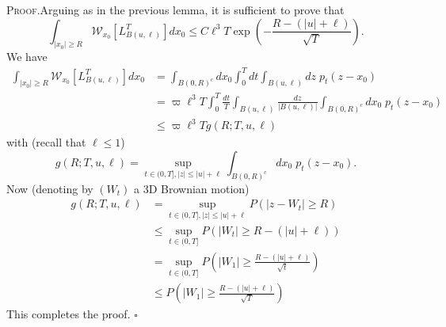 \documentclass[a4paper,12pt]{article}
\begin{document}
\textsc{Proof.}\hspace{0.3cm}Arguing as in the previous lemma, it is
sufficient to prove that
\[
\int_{\left|  x_{0}\right|  \geq R}\mathcal{W}_{x_{0}}[L_{B(u,\ell)}%
^{T}]dx_{0}\leq C\ell^{3}T\exp\left(  -\frac{R-\left(  \left|  u\right|
+\ell\right)  }{\sqrt{T}}\right)  .
\]
We have
\begin{align*}
\int_{\left|  x_{0}\right|  \geq R}\mathcal{W}_{x_{0}}[L_{B(u,\ell)}%
^{T}]dx_{0}  &  =\int_{B(0,R)^{c}}dx_{0}\int_{0}^{T}dt\int_{B(u,\ell
)}dz\;p_{t}\left(  z-x_{0}\right) \\
&  =\varpi\ell^{3}T\int_{0}^{T}\frac{dt}{T}\int_{B(u,\ell)}\frac{dz}%
{|B(u,\ell)|}\int_{B(0,R)^{c}}dx_{0}\;p_{t}\left(  z-x_{0}\right) \\
&  \leq\varpi\ell^{3}Tg\left(  R;T,u,\ell\right)
\end{align*}
with (recall that $\ell\leq1$)
\[
g\left(  R;T,u,\ell\right)  =\sup_{t\in(0,T],\left|  z\right|  \leq\left|
u\right|  +\ell}\int_{B(0,R)^{c}}dx_{0}\;p_{t}\left(  z-x_{0}\right)  .
\]
Now (denoting by $\left(  W_{t}\right)  $ a 3D Brownian motion)
\begin{align*}
g\left(  R;T,u,\ell\right)   &  =\sup_{t\in(0,T],\left|  z\right|  \leq\left|
u\right|  +\ell}P\left(  \left|  z-W_{t}\right|  \geq R\right) \\
&  \leq\sup_{t\in(0,T]}P\left(  \left|  W_{t}\right|  \geq R-\left(  \left|
u\right|  +\ell\right)  \right) \\
&  =\sup_{t\in(0,T]}P\left(  \left|  W_{1}\right|  \geq\frac{R-\left(  \left|
u\right|  +\ell\right)  }{\sqrt{t}}\right) \\
&  \leq P\left(  \left|  W_{1}\right|  \geq\frac{R-\left(  \left|  u\right|
+\ell\right)  }{\sqrt{T}}\right)
\end{align*}
This completes the proof. \hfill$\square$

%
%
%
%
%
\end{document}
